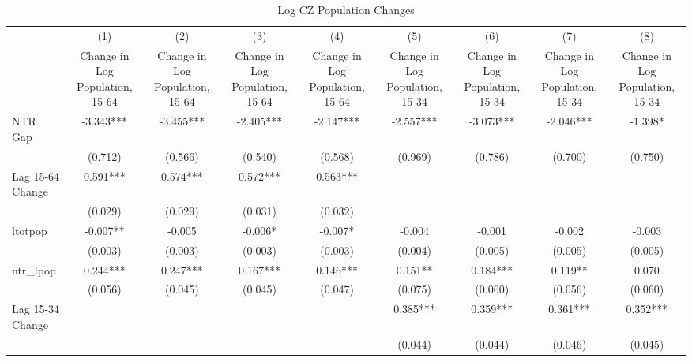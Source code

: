 \begin{table}[htbp]\centering
\def\sym#1{\ifmmode^{#1}\else\(^{#1}\)\fi}
\caption{Log CZ Population Changes}
\begin{tabular}{l*{8}{c}}
\toprule
                    &\multicolumn{1}{c}{(1)}&\multicolumn{1}{c}{(2)}&\multicolumn{1}{c}{(3)}&\multicolumn{1}{c}{(4)}&\multicolumn{1}{c}{(5)}&\multicolumn{1}{c}{(6)}&\multicolumn{1}{c}{(7)}&\multicolumn{1}{c}{(8)}\\
                    &\multicolumn{1}{c}{Change in Log Population, 15-64}&\multicolumn{1}{c}{Change in Log Population, 15-64}&\multicolumn{1}{c}{Change in Log Population, 15-64}&\multicolumn{1}{c}{Change in Log Population, 15-64}&\multicolumn{1}{c}{Change in Log Population, 15-34}&\multicolumn{1}{c}{Change in Log Population, 15-34}&\multicolumn{1}{c}{Change in Log Population, 15-34}&\multicolumn{1}{c}{Change in Log Population, 15-34}\\
\midrule
NTR Gap             &   -3.343***&   -3.455***&   -2.405***&   -2.147***&   -2.557***&   -3.073***&   -2.046***&   -1.398*  \\
                    &  (0.712)   &  (0.566)   &  (0.540)   &  (0.568)   &  (0.969)   &  (0.786)   &  (0.700)   &  (0.750)   \\
\addlinespace
Lag 15-64 Change    &    0.591***&    0.574***&    0.572***&    0.563***&            &            &            &            \\
                    &  (0.029)   &  (0.029)   &  (0.031)   &  (0.032)   &            &            &            &            \\
\addlinespace
ltotpop             &   -0.007** &   -0.005   &   -0.006*  &   -0.007*  &   -0.004   &   -0.001   &   -0.002   &   -0.003   \\
                    &  (0.003)   &  (0.003)   &  (0.003)   &  (0.003)   &  (0.004)   &  (0.005)   &  (0.005)   &  (0.005)   \\
\addlinespace
ntr\_lpop            &    0.244***&    0.247***&    0.167***&    0.146***&    0.151** &    0.184***&    0.119** &    0.070   \\
                    &  (0.056)   &  (0.045)   &  (0.045)   &  (0.047)   &  (0.075)   &  (0.060)   &  (0.056)   &  (0.060)   \\
\addlinespace
Lag 15-34 Change    &            &            &            &            &    0.385***&    0.359***&    0.361***&    0.352***\\
                    &            &            &            &            &  (0.044)   &  (0.044)   &  (0.046)   &  (0.045)   \\

\end{tabular}
\end{table}
